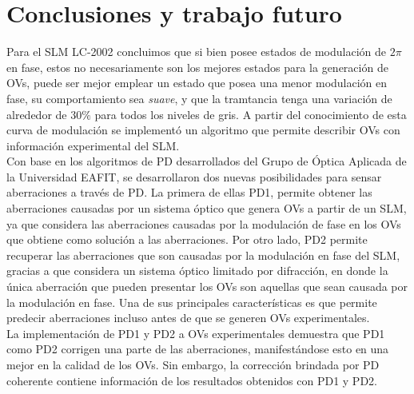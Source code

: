 \chapter{Conclusiones y trabajo futuro}
\label{cap:conclusiones}

%
%
%
%

Para el SLM LC-2002 concluimos que si bien posee estados de modulación de $2\pi$ en fase, estos no necesariamente son los mejores estados para la generación de OVs, puede ser mejor emplear un estado que posea una menor modulación en fase, su comportamiento sea \textit{suave}, y que la tramtancia tenga una variación de alrededor de $30\%$ para todos los niveles de gris. A partir del conocimiento de esta curva de modulación se implementó un algoritmo que permite describir OVs con información experimental del SLM.\\


Con base en los algoritmos de PD desarrollados del Grupo de Óptica Aplicada de la Universidad EAFIT, se desarrollaron dos nuevas posibilidades para sensar aberraciones a través de PD. La primera de ellas PD1, permite obtener las aberraciones causadas por un sistema óptico que genera OVs a partir de un SLM, ya que considera las aberraciones causadas por la modulación de fase en los OVs que obtiene como solución a las aberraciones. Por otro lado, PD2 permite recuperar las aberraciones que son causadas por la modulación en fase del SLM, gracias a que considera un sistema óptico limitado por difracción, en donde la única aberración que pueden presentar los OVs son aquellas que sean causada por la modulación en fase. Una de sus  principales características es que permite predecir aberraciones incluso antes de que se generen OVs experimentales.\\

La implementación de PD1 y PD2 a OVs experimentales demuestra que PD1 como PD2 corrigen una parte de las aberraciones, manifestándose esto en una mejor en la calidad de los OVs. Sin embargo, la corrección brindada por PD coherente contiene información de los resultados obtenidos con PD1 y PD2.\\

